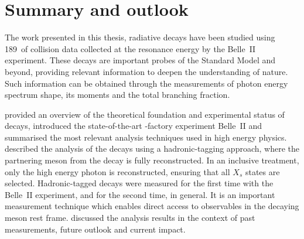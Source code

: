 \chapter{Summary and outlook}\label{ch:summary}

The work presented in this thesis, radiative \BtoXsgamma decays have been studied using 189~\invfb of \epem collision data collected at the \FourS resonance energy by the Belle~II experiment.
These decays are important probes of the Standard Model and beyond, providing relevant information to deepen the understanding of nature.
Such information can be obtained through the measurements of \BtoXsgamma photon energy spectrum shape, its moments and the total branching fraction.

 provided an overview of the theoretical foundation and experimental status of \mbox{\BtoXsgamma} decays, 
introduced the state-of-the-art \B-factory experiment Belle~II and summarised the most relevant analysis techniques used in high energy physics.
 described the analysis
of the \BtoXsgamma decays using a hadronic-tagging approach, where the partnering \B meson from the \FourS decay is fully reconstructed.
In an inclusive treatment, only the high energy photon is reconstructed, ensuring that all $X_s$ states are selected.
Hadronic-tagged \BtoXsgamma decays were measured for the first time with the Belle~II experiment, and for the second time, in general.
It is an important measurement technique which enables direct access to observables in the decaying \B meson rest frame.
 discussed the analysis results in the context of past measurements, future outlook and current impact.

